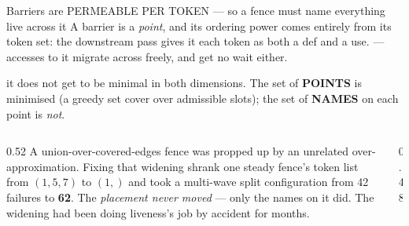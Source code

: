 \begin{frame}{Barriers are PERMEABLE PER TOKEN --- so a fence must name everything live across it}
\footnotesize
A barrier is a \emph{point}, and its ordering power comes entirely from its token set: the downstream pass gives
it each token as both a def and a use. 
--- accesses to it migrate across freely, and get no wait either.

\begin{center}
\end{center}
\vspace{-2mm}
\begin{center}
\begin{minipage}{0.86\textwidth}
 it does not get to be minimal in both dimensions.
The set of \textbf{POINTS} is minimised (a greedy set cover over admissible slots); the set of \textbf{NAMES}
on each point is \emph{not}.
\end{minipage}
\end{center}

\begin{columns}[T]
\begin{column}{0.52\textwidth}
 A union-over-covered-edges fence was propped up by an unrelated
over-approximation. Fixing that widening shrank one steady fence's token list from $(1,5,7)$ to $(1,)$ and took a
multi-wave split configuration from 42 failures to \textbf{62}. The \emph{placement never moved} --- only the names
on it did. The widening had been doing liveness's job by accident for months.
\end{column}
\begin{column}{0.48\textwidth}
\begin{center}
\end{center}
\end{column}
\end{columns}
\end{frame}
